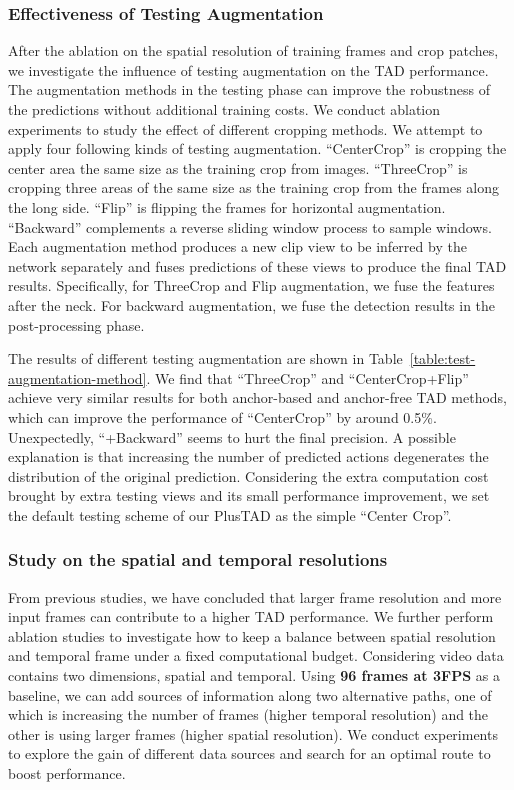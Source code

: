 \documentclass[a4paper,fleqn]{cas-dc}
\begin{document}
\subsubsection{Effectiveness of Testing Augmentation}
After the ablation on the spatial resolution of training frames and crop patches, we investigate the influence of testing augmentation on the TAD performance. The augmentation methods in the testing phase can improve the robustness of the predictions without additional training costs.
We conduct ablation experiments to study the effect of different cropping methods.
We attempt to apply four following kinds of testing augmentation. 
``CenterCrop'' is cropping the center area the same size as the training crop from images. 
``ThreeCrop'' is cropping three areas of the same size as the training crop from the frames along the long side.
``Flip'' is flipping the frames for horizontal augmentation. 
``Backward'' complements a reverse sliding window process to sample windows. 
Each augmentation method produces a new clip view to be inferred by the network separately and fuses predictions of these views to produce the final TAD results.
Specifically, for ThreeCrop and Flip augmentation, we fuse the features after the neck. For backward augmentation, we fuse the detection results in the post-processing phase.

The results of different testing augmentation are shown in Table~\ref{table:test-augmentation-method}.
We find that ``ThreeCrop'' and ``CenterCrop+Flip'' achieve very similar results for both anchor-based and anchor-free TAD methods, which can improve the performance of ``CenterCrop'' by around 0.5\%.
Unexpectedly, ``+Backward'' seems to hurt the final precision. A possible explanation is that increasing the number of predicted actions degenerates the distribution of the original prediction. Considering the extra computation cost brought by extra testing views and its small performance improvement, we set the default testing scheme of our PlusTAD as the simple ``Center Crop''.








\subsubsection{Study on the spatial and temporal resolutions}
From previous studies, we have concluded that larger frame resolution and more input frames can contribute to a higher TAD performance. We further perform ablation studies to investigate how to keep a balance between spatial resolution and temporal frame under a fixed computational budget. 
Considering video data contains two dimensions, spatial and temporal. Using \textbf{96 frames at 3FPS} as a baseline, we can add sources of information along two alternative paths, one of which is increasing the number of frames (higher temporal resolution) and the other is using larger frames (higher spatial resolution).
We conduct experiments to explore the gain of different data sources and search for an optimal route to boost performance.
\end{document}
